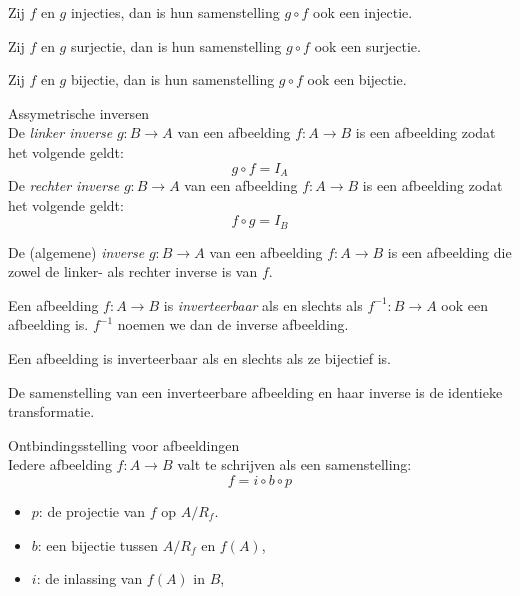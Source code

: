\documentclass[main.tex]{subfiles}
\begin{document}
\begin{st}
  Zij $f$ en $g$ injecties, dan is hun samenstelling $g \circ f$ ook een injectie.
\end{st}

\begin{st}
  Zij $f$ en $g$ surjectie, dan is hun samenstelling $g \circ f$ ook een surjectie.
\end{st}

\begin{st}
  Zij $f$ en $g$ bijectie, dan is hun samenstelling $g \circ f$ ook een bijectie.
\end{st}

\begin{de}
  Assymetrische inversen\\
  De \emph{linker inverse} $g:B \rightarrow A$ van een afbeelding $f:A \rightarrow B$ is een afbeelding zodat het volgende geldt:
  \[ g \circ f = I_{A} \]
  De \emph{rechter inverse} $g:B \rightarrow A$ van een afbeelding $f:A \rightarrow B$ is een afbeelding zodat het volgende geldt:
  \[ f \circ g = I_{B}\]
\end{de}

\begin{de}
  De (algemene) \emph{inverse} $g:B \rightarrow A$ van een afbeelding $f:A \rightarrow B$ is een afbeelding die zowel de linker- als rechter inverse is van $f$.
\end{de}

\begin{de}
  Een afbeelding $f: A \rightarrow B$ is \emph{inverteerbaar} als en slechts als $f^{-1}: B \rightarrow A$ ook een afbeelding is. $f^{-1}$ noemen we dan de inverse afbeelding.
\end{de}

\begin{st}
  \label{st:afb-inverse-asa-bijectief}
  Een afbeelding is inverteerbaar als en slechts als ze bijectief is.
\end{st}

\begin{st}
  \label{st:afb+inverse=identieke}
  De samenstelling van een inverteerbare afbeelding en haar inverse is de identieke transformatie.
\end{st}

\begin{st}
  Ontbindingsstelling voor afbeeldingen\\
  Iedere afbeelding $f:A\rightarrow B$ valt te schrijven als een samenstelling:
  \[ f = i \circ b \circ p \]
  \begin{itemize}
  \item $p$: de projectie van $f$ op $A/R_{f}$.
  \item $b$: een bijectie tussen $A/R_{f}$ en $f(A)$,
  \item $i$: de inlassing van $f(A)$ in $B$,
  \end{itemize}

\end{st}
\end{document}
